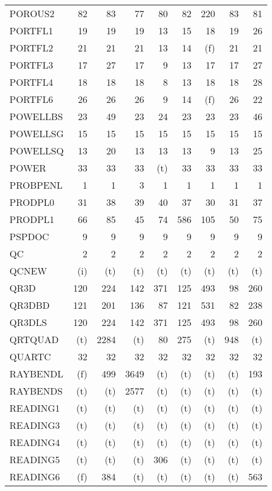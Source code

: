 \documentclass[11pt,twoside]{article}
\begin{document}
{\begin{longtable}[c]{|l|r|r|r|r|r|r|r|r|}
 POROUS2 & 82 & 83 & 77 & 80 & 82 & 220 & 83 & 81 \\
 PORTFL1 & 19 & 19 & 19 & 13 & 15 & 18 & 19 & 26 \\
 PORTFL2 & 21 & 21 & 21 & 13 & 14 & (f) & 21 & 21 \\
 PORTFL3 & 17 & 27 & 17 & 9 & 13 & 17 & 17 & 27 \\
 PORTFL4 & 18 & 18 & 18 & 8 & 13 & 18 & 18 & 28 \\
 PORTFL6 & 26 & 26 & 26 & 9 & 14 & (f) & 26 & 22 \\
 POWELLBS & 23 & 49 & 23 & 24 & 23 & 23 & 23 & 46 \\
 POWELLSG & 15 & 15 & 15 & 15 & 15 & 15 & 15 & 15 \\
 POWELLSQ & 13 & 20 & 13 & 13 & 13 & 9 & 13 & 25 \\
 POWER & 33 & 33 & 33 & (t) & 33 & 33 & 33 & 33 \\
 PROBPENL & 1 & 1 & 3 & 1 & 1 & 1 & 1 & 1 \\
 PRODPL0 & 31 & 38 & 39 & 40 & 37 & 30 & 31 & 37 \\
 PRODPL1 & 66 & 85 & 45 & 74 & 586 & 105 & 50 & 75 \\
 PSPDOC & 9 & 9 & 9 & 9 & 9 & 9 & 9 & 9 \\
 QC & 2 & 2 & 2 & 2 & 2 & 2 & 2 & 2 \\
 QCNEW & (i) & (t) & (t) & (t) & (t) & (t) & (t) & (t) \\
 QR3D & 120 & 224 & 142 & 371 & 125 & 493 & 98 & 260 \\
 QR3DBD & 121 & 201 & 136 & 87 & 121 & 531 & 82 & 238 \\
 QR3DLS & 120 & 224 & 142 & 371 & 125 & 493 & 98 & 260 \\
 QRTQUAD & (t) & 2284 & (t) & 80 & 275 & (t) & 948 & (t) \\
 QUARTC & 32 & 32 & 32 & 32 & 32 & 32 & 32 & 32 \\
 RAYBENDL & (f) & 499 & 3649 & (t) & (t) & (t) & (t) & 193 \\
 RAYBENDS & (t) & (t) & 2577 & (t) & (t) & (t) & (t) & (t) \\
 READING1 & (t) & (t) & (t) & (t) & (t) & (t) & (t) & (t) \\
 READING3 & (t) & (t) & (t) & (t) & (t) & (t) & (t) & (t) \\
 READING4 & (t) & (t) & (t) & (t) & (t) & (t) & (t) & (t) \\
 READING5 & (t) & (t) & (t) & 306 & (t) & (t) & (t) & (t) \\
 READING6 & (f) & 384 & (t) & (t) & (t) & (t) & (t) & 563 \\

\end{longtable}}
\end{document}
